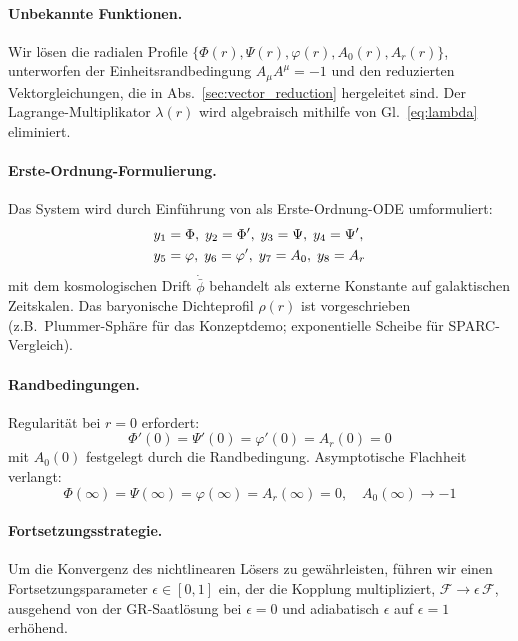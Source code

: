 \documentclass[aps,prd,twocolumn,superscriptaddress,nofootinbib]{revtex4-2}
\begin{document}
\paragraph{Unbekannte Funktionen.}
Wir l\"osen die radialen Profile $\{\Phi(r), \Psi(r), \varphi(r), A_0(r), A_r(r)\}$, unterworfen der Einheitsrandbedingung $A_\mu A^\mu = -1$ und den reduzierten Vektorgleichungen, die in Abs.~\ref{sec:vector_reduction} hergeleitet sind. Der Lagrange-Multiplikator $\lambda(r)$ wird algebraisch mithilfe von Gl.~\eqref{eq:lambda} eliminiert.

\paragraph{Erste-Ordnung-Formulierung.}
Das System wird durch Einf\"uhrung von als Erste-Ordnung-ODE umformuliert:
\begin{align}
y_1 &= \Phi,\; y_2 = \Phi',\; y_3 = \Psi,\; y_4 = \Psi', \notag \\
y_5 &= \varphi,\; y_6 = \varphi',\; y_7 = A_0,\; y_8 = A_r
\end{align}
mit dem kosmologischen Drift $\dot{\bar{\phi}}$ behandelt als externe Konstante auf galaktischen Zeitskalen. Das baryonische Dichteprofil $\rho(r)$ ist vorgeschrieben (z.B.\ Plummer-Sph\"are f\"ur das Konzeptdemo; exponentielle Scheibe f\"ur SPARC-Vergleich).

\paragraph{Randbedingungen.}
Regularit\"at bei $r = 0$ erfordert:
\begin{equation}
\Phi'(0) = \Psi'(0) = \varphi'(0) = A_r(0) = 0
\end{equation}
mit $A_0(0)$ festgelegt durch die Randbedingung. Asymptotische Flachheit verlangt:
\begin{equation}
\Phi(\infty) = \Psi(\infty) = \varphi(\infty) = A_r(\infty) = 0, \quad A_0(\infty) \to -1
\end{equation}

\paragraph{Fortsetzungsstrategie.}
Um die Konvergenz des nichtlinearen L\"osers zu gew\"ahrleisten, f\"uhren wir einen Fortsetzungsparameter $\epsilon \in [0,1]$ ein, der die Kopplung multipliziert, $\mathcal{F} \to \epsilon\,\mathcal{F}$, ausgehend von der GR-Saatl\"osung bei $\epsilon = 0$ und adiabatisch $\epsilon$ auf $\epsilon = 1$ erh\"ohend.
\end{document}
